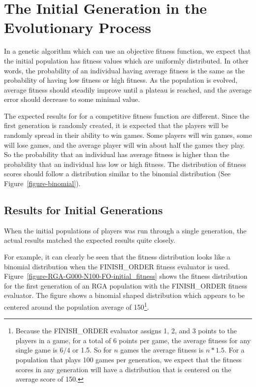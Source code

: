 \section{The Initial Generation in the Evolutionary Process}

In a genetic algorithm which can use an objective fitness function, we expect
that the initial population has fitness values which are uniformly distributed.
In other words, the probability of an individual having average fitness is the
same as the probability of having low fitness or high fitness. As the population
is evolved, average fitness should steadily improve until a plateau is reached,
and the average error should decrease to some minimal value.

The expected results for for a competitive fitness function are different. Since
the first generation is randomly created, it is expected that the players will
be randomly spread in their ability to win games. Some players will win games,
some will lose games, and the average player will win about half the games they
play. So the probability that an individual has average fitness is higher than
the probability that an individual has low or high fitness. The distribution of
fitness scores should follow a distribution similar to the binomial distribution
(See Figure~\ref{figure-binomial}).

\subsection{Results for Initial Generations}

When the initial populations of players was run through a single generation, the
actual results matched the expected results quite closely. 

For example, it can clearly be seen that the fitness distribution looks like a
binomial distribution when the FINISH\_ORDER fitness evaluator is used.
Figure~\ref{figure-RGA-G000-N100-FO-initial_fitness} shows the fitness
distribution for the first generation of an RGA population with the
FINISH\_ORDER fitness evaluator. The figure shows a binomial shaped distribution
which appears to be centered around the population average of 150\footnote{Because
the FINISH\_ORDER evaluator assigns 1, 2, and 3 points to the players in a game, for
a total of 6 points per game, the average fitness for any single game is \(6/4\)
or 1.5. So for \(n\) games the average fitness is \(n * 1.5\).
For a population that plays 100 games per generation, we expect that the fitness
scores in any generation will have a distribution that is centered on the
average score of 150.}.

